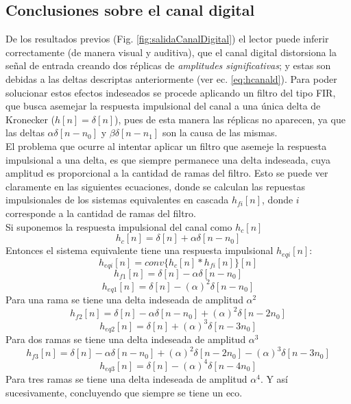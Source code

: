 \documentclass[letterpaper, 10 pt, conference]{ieeeconf}  %
\begin{document}
\subsection{Conclusiones sobre el canal digital}
De los resultados previos (Fig. \ref{fig:salidaCanalDigital}) el lector puede inferir correctamente (de manera visual y auditiva), que el canal digital distorsiona la se\~nal de entrada creando dos r\'eplicas de \textit{amplitudes significativas}; y estas son debidas a las deltas descriptas anteriormente (ver ec. \ref{eq:hcanald}). Para poder solucionar estos efectos indeseados se procede aplicando un filtro del tipo FIR, que busca asemejar la respuesta impulsional del canal a una \'unica delta de Kronecker ($h[n]=\delta[n]$), pues de esta manera las r\'eplicas no aparecen, ya que las deltas $\alpha\delta[n-n_0]$ y $\beta\delta[n-n_1]$ son la causa de las mismas. \\
El problema que ocurre al intentar aplicar un filtro que asemeje la respuesta impulsional a una delta, es que siempre permanece una delta indeseada, cuya amplitud es proporcional a la cantidad de ramas del filtro. Esto se puede ver claramente en las siguientes ecuaciones, donde se calculan las repuestas impulsionales de los sistemas equivalentes en cascada $h_{fi}[n]$, donde $i$ corresponde a la cantidad de ramas del filtro. \\
Si suponemos la respuesta impulsional del canal como $h_c[n]$
\begin{equation*}
  h_c[n] = \delta[n] + \alpha\delta[n-n_0]
\end{equation*}
Entonces el sistema equivalente tiene una respuesta impulsional $h_{eqi}[n]$:
\begin{equation*}
  h_{eqi}[n] = conv\{ h_c[n] * h_{fi}[n] \}[n]
\end{equation*}
\begin{equation*}
  h_{f1}[n] = \delta[n] - \alpha\delta[n-n_0]
\end{equation*}
\begin{equation*}
  h_{eq1}[n] = \delta[n] - (\alpha)^2\delta[n-n_0]
\end{equation*}
Para una rama se tiene una delta indeseada de amplitud $\alpha^2$
\begin{equation*}
  h_{f2}[n] = \delta[n] - \alpha\delta[n-n_0] + (\alpha)^2\delta[n-2n_0]
\end{equation*}
\begin{equation*}
  h_{eq2}[n] = \delta[n] + (\alpha)^3\delta[n-3n_0]
\end{equation*}
Para dos ramas se tiene una delta indeseada de amplitud $\alpha^3$
\begin{equation*}
  h_{f3}[n] = \delta[n] - \alpha\delta[n-n_0] + (\alpha)^2\delta[n-2n_0] - (\alpha)^3\delta[n-3n_0]
\end{equation*}
\begin{equation*}
  h_{eq3}[n] = \delta[n] - (\alpha)^4\delta[n-4n_0]
\end{equation*}
Para tres ramas se tiene una delta indeseada de amplitud $\alpha^4$. Y as\'i sucesivamente, concluyendo que siempre se tiene un eco.
\end{document}
